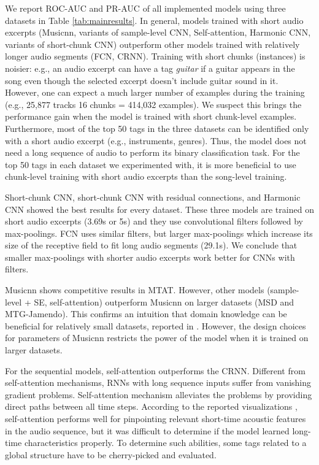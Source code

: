 \documentclass{article}
\begin{document}
We report ROC-AUC and PR-AUC of all implemented models using three datasets in Table \ref{tab:mainresults}. In general, models trained with short audio excerpts (Musicnn, variants of sample-level CNN, Self-attention, Harmonic CNN, variants of short-chunk CNN) outperform other models trained with relatively longer audio segments (FCN, CRNN). Training with short chunks (instances) is noisier: e.g., an audio excerpt can have a tag \textit{guitar} if a guitar appears in the song even though the selected excerpt doesn't include guitar sound in it. However, one can expect a much larger number of examples during the training (e.g., 25,877 tracks  16 chunks = 414,032 examples). We suspect this brings the performance gain when the model is trained with short chunk-level examples. Furthermore, most of the top 50 tags in the three datasets can be identified only with a short audio excerpt (e.g., instruments, genres). Thus, the model does not need a long sequence of audio to perform its binary classification task. For the top 50 tags in each dataset we experimented with, it is more beneficial to use chunk-level training with short audio excerpts than the song-level training.


Short-chunk CNN, short-chunk CNN with residual connections, and Harmonic CNN showed the best results for every dataset. These three models are trained on short audio excerpts (3.69s or 5s) and they use  convolutional filters followed by  max-poolings. 
FCN uses similar filters, but larger max-poolings which increase its size of the receptive field to fit long audio segments (29.1s). We conclude that smaller max-poolings with shorter audio excerpts work better for CNNs with  filters. 




Musicnn shows competitive results in MTAT. However, other models (sample-level + SE, self-attention) outperform Musicnn on larger datasets (MSD and MTG-Jamendo). This confirms an intuition that domain knowledge can be beneficial for relatively small datasets, reported in \cite{pons2018end}. However, the design choices for parameters of Musicnn restricts the power of the model when it is trained on larger datasets.


For the sequential models, self-attention outperforms the CRNN. Different from self-attention mechanisms, RNNs with long sequence inputs suffer from vanishing gradient problems. Self-attention mechanism alleviates the problems by providing direct paths between all time steps. According to the reported visualizations \cite{won2019toward}, self-attention performs well for pinpointing relevant short-time acoustic features in the audio sequence, but it was difficult to determine if the model learned long-time characteristics properly. To determine such abilities, some tags related to a global structure have to be cherry-picked and evaluated.
\end{document}
